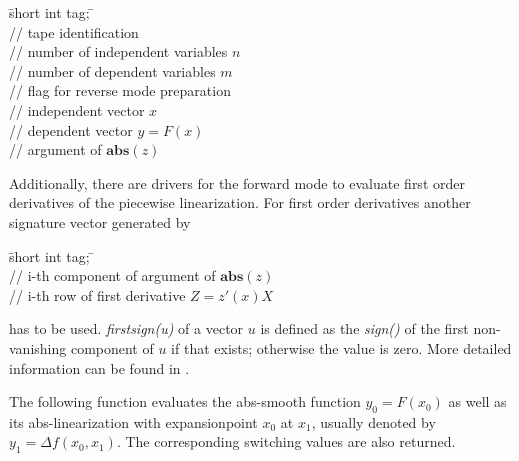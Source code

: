 \begin{tabbing}
\hspace{0.5in}\={\sf short int tag;} \hspace{1.1in}\= \kill    %
\\
         \> // tape identification \\
                 \> // number of independent variables $n$\\
                 \> // number of dependent variables $m$\\
              \> // flag for reverse mode preparation\\
           \> // independent vector $x$ \\
           \> // dependent vector $y=F(x)$ \\
           \> // argument of $\mathbf{abs}(z)$ 
\end{tabbing}
%
Additionally, there are drivers for the forward mode to evaluate first order 
derivatives of the piecewise linearization. For first order derivatives another 
signature vector generated by 
\begin{tabbing}
\hspace{0.5in}\={\sf short int tag;} \hspace{1.1in}\= \kill    %
\\
          \> // i-th component of argument of $\mathbf{abs}(z)$ \\
          \> // i-th row of first derivative $Z=z\prime (x)X$
\end{tabbing}
has to be used. \textit{firstsign(u)} of a vector $u$ is defined as the \textit{sign()} 
of the first non-vanishing component of $u$ if that exists; otherwise the value is zero. 
More detailed information can be found in \cite{Griewank13}. 

The following function evaluates the abs-smooth function $y_0 = F(x_0)$ as well as its
abs-linearization with expansionpoint $x_0$ at $x_1$, usually denoted by 
$ y_1 = \Delta f(x_0, x_1)$. The corresponding switching values are also returned. 

